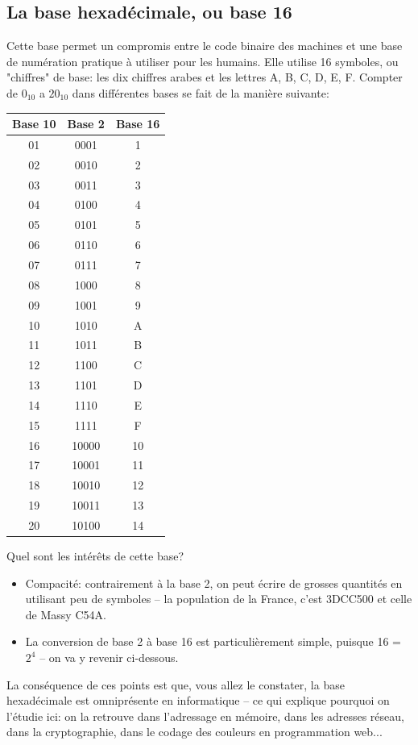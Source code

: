 \documentclass[12pt]{article}
\begin{document}
	\subsection{La base hexadécimale, ou base 16}
	Cette base permet un compromis entre le code binaire des machines et une base de numération pratique à utiliser pour les humains. Elle utilise 16 symboles, ou "chiffres" de base: les dix chiffres arabes et les lettres A, B, C, D, E, F. Compter de $0_{10}$ a $20_{10}$ dans différentes bases se fait de la manière suivante:
	\par
	\begin{center}	
		\begin{tabular}{|c|c|c|}
			\hline
			\textbf{Base 10} & \textbf{Base 2} & \textbf{Base 16} \\
			\hline
			01 & 0001 & 1 \\ \hline
			02 & 0010 & 2 \\ \hline
			03 & 0011 & 3 \\ \hline
			04 & 0100 & 4 \\ \hline
			05 & 0101 & 5 \\ \hline
			06 & 0110 & 6 \\ \hline
			07 & 0111 & 7 \\ \hline
			08 & 1000 & 8 \\ \hline
			09 & 1001 & 9 \\ \hline
			10 & 1010 & A \\ \hline
			11 & 1011 & B \\ \hline
			12 & 1100 & C \\ \hline
			13 & 1101 & D \\ \hline
			14 & 1110 & E \\ \hline
			15 & 1111 & F \\ \hline
			16 & 10000 & 10 \\ \hline
			17 & 10001 & 11 \\ \hline
			18 & 10010 & 12 \\ \hline
			19 & 10011 & 13 \\ \hline
			20 & 10100 & 14 \\ \hline
		\end{tabular}
	\end{center}
	\par
	 Quel sont les intérêts de cette base?
	 \begin{itemize}
	 	\item Compacité: contrairement à la base 2, on peut écrire de grosses quantités en utilisant peu de symboles -- la population de la France, c'est 3DCC500 et celle de Massy C54A.
	 	\item La conversion de base 2 à base 16 est particulièrement simple, puisque 16 = $2^4$ -- on va y revenir ci-dessous.
	 \end{itemize}
	 La conséquence de ces points est que, vous allez le constater, la base hexadécimale est omniprésente en informatique -- ce qui explique pourquoi on l'étudie ici: on la retrouve dans l'adressage en mémoire, dans les adresses réseau, dans la cryptographie, dans le codage des couleurs en programmation web...
\end{document}
